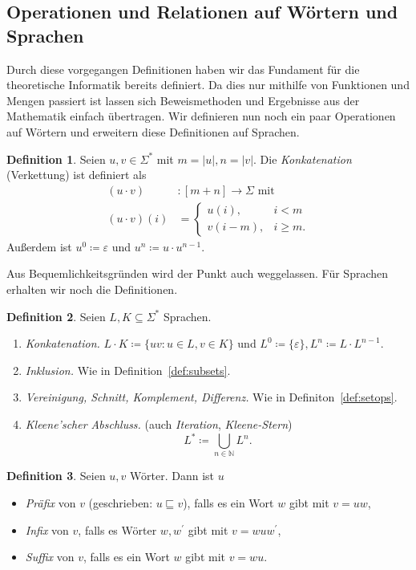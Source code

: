 \documentclass[11pt, a4paper]{article}
\theoremstyle{definition}
\newtheorem{definition}{Definition}[section]
\theoremstyle{plain}
\numberwithin{equation}{section}
\begin{document}
\subsection{Operationen und Relationen auf Wörtern und Sprachen}\label{sec:awl_wordops}
Durch diese vorgegangen Definitionen haben wir das Fundament für die theoretische Informatik bereits definiert. Da dies nur mithilfe von Funktionen und Mengen  passiert ist lassen sich Beweismethoden und Ergebnisse aus der Mathematik einfach übertragen. Wir definieren nun noch ein paar Operationen auf Wörtern und erweitern diese Definitionen auf Sprachen.
\begin{definition}
	Seien \( u, v \in \Sigma^\ast \) mit \( m = \left| u \right|, n = \left| v \right| \). Die \textit{Konkatenation} (Verkettung) ist definiert als
	\begin{align*}
		(u \cdot v)&\colon [m{+}n] \to \Sigma \text{ mit}\\
		(u \cdot v)(i) &= \left\lbrace \begin{array}{ll}u(i), & i < m\\ v(i-m), & i \geq m. \end{array} \right.
	\end{align*}
	Außerdem ist \( u^0 \coloneqq \varepsilon \) und \( u^n \coloneqq u \cdot u^{n-1} \).
\end{definition}
Aus Bequemlichkeitsgründen wird der Punkt auch weggelassen. Für Sprachen erhalten wir noch die Definitionen.
\begin{definition}
	Seien \( L, K \subseteq \Sigma^\ast \) Sprachen.
	\begin{enumerate}
		\item \textit{Konkatenation.} \( L \cdot K \coloneqq \{ uv : u \in L, v \in K \} \) und \( L^0 \coloneqq \{ \varepsilon \}, L^n \coloneqq L \cdot L^{n-1} \).
		\item \textit{Inklusion.} Wie in Definition~\ref{def:subsets}.
		\item \textit{Vereinigung, Schnitt, Komplement, Differenz.} Wie in Definiton~\ref{def:setops}.
		\item \textit{Kleene'scher Abschluss.} (auch \textit{Iteration}, \textit{Kleene-Stern})
			\[
				L^\ast \coloneqq \bigcup_{n \in \mathbb{N}} L^n.
			\]
	\end{enumerate}
\end{definition}
\begin{definition}
	Seien \( u, v \) Wörter. Dann ist \( u \)
	\begin{itemize}
		\item \textit{Präfix} von \( v \) (geschrieben: \( u \sqsubseteq v \)), falls es ein Wort \( w \) gibt mit \( v = uw \),
		\item \textit{Infix} von \( v \), falls es Wörter \( w, w^\prime \) gibt mit \( v = wuw^\prime \),
		\item \textit{Suffix} von \( v \), falls es ein Wort \( w \) gibt mit \( v = wu \).
	\end{itemize}
\end{definition}
\end{document}
